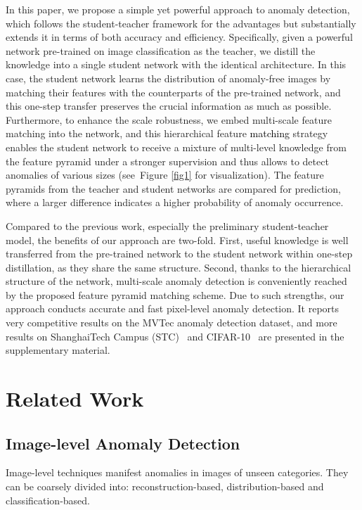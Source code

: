\documentclass{bmvc2k}
\newcommand{\wgd}[1]{\textcolor{black}{{}#1}}
\begin{document}
In this paper, we propose a simple yet powerful approach to anomaly detection, which follows the student-teacher framework for the advantages but substantially extends it in terms of both accuracy and efficiency. Specifically, given a powerful network pre-trained on image classification as the teacher, we distill the knowledge into a single student network with the identical architecture. In this case, the student network learns the distribution of anomaly-free images by matching their features with the counterparts of the pre-trained network, and this one-step transfer preserves the crucial information as much as possible. Furthermore, to enhance the scale robustness, we embed multi-scale feature matching into the network, and this hierarchical feature \wgd{matching} strategy enables the student network to receive a mixture of multi-level knowledge from the feature pyramid under a stronger supervision and thus allows to detect anomalies of various sizes (see~Figure \ref{fig1} for visualization). The feature pyramids from the teacher and student networks are compared for prediction, where a larger difference indicates a higher probability of anomaly occurrence.

Compared to the previous work, especially the preliminary student-teacher model, the benefits of our approach are two-fold. First, useful knowledge is well transferred from the pre-trained network to the student network within one-step distillation, as they share the same structure. Second, thanks to the hierarchical structure of the network, multi-scale anomaly detection is conveniently reached by the proposed feature pyramid matching scheme.
Due to such strengths, our approach conducts accurate and fast pixel-level anomaly detection. It reports very competitive results on the MVTec anomaly detection dataset, and more results on ShanghaiTech Campus (STC)~\cite{Luo_2017_ICCV} and CIFAR-10~\cite{Krizhevsky2009} are presented in the supplementary material.



\section{Related Work}
\label{sec2}

\subsection{Image-level Anomaly Detection}
\label{sec2-sub1}

Image-level techniques manifest anomalies in images of unseen categories. They can be coarsely divided into: reconstruction-based, distribution-based and classification-based.
\end{document}
